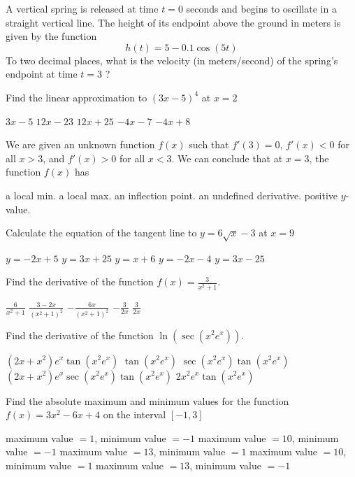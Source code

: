 \documentclass[11pt]{article}
\begin{document}
\begin{questions}
\begin{multiplechoice}{5}
\question A vertical spring is released at time $t = 0$ seconds and begins to oscillate in a straight vertical line.
The height of its endpoint above the ground in meters is given by the function
$$h(t) = 5 - 0.1\cos(5t)$$
To two decimal places, what is the velocity (in meters/second) of the spring's endpoint at time $t = 3$ ?
\begin{answers}{2}
\end{answers}

\newpage

\question Find the linear approximation to $(3x-5)^4$ at $x = 2$
\begin{answers}{2}
\ans $3x - 5$
\ans $12x - 23$
\ans $12x + 25$
\ans $-4x - 7$
\ans $-4x + 8$
\end{answers}


\question We are given an unknown function $f(x)$ such that $f'(3) = 0$, $f'(x) < 0$ for all $x > 3$, and $f'(x) > 0$ for all $x < 3$.
We can conclude that at $x = 3$, the function $f(x)$ has 
\begin{answers}{3}
\ans a local min.
\ans a local max.
\ans an inflection point.
\ans an undefined derivative.
\ans positive $y$-value.
\end{answers}

\question Calculate the equation of the tangent line to $y = 6 \sqrt{x} - 3$ at $x = 9$
\begin{answers}{2}
\ans $y = -2x + 5$
\ans $y = 3x + 25$
\ans $y = x + 6$
\ans $y = -2x -4$
\ans $y = 3x - 25$
\end{answers}


\question Find the derivative of the function $\displaystyle f(x) = \frac{3}{x^2 +1}$.
\begin{answers}{2}
\ans $ \displaystyle \frac{6}{x^2 + 1}$
\ans $ \displaystyle  \frac{3 - 2x }{(x^2 + 1)^2}$
\ans $ \displaystyle -\frac{6x}{(x^2 + 1)^2}$
\ans $ \displaystyle  - \frac{3}{2x}$
\ans $ \displaystyle  \frac{3}{2x}$
\end{answers}

\question Find the derivative of the function $\ln(\sec(x^2 e^x))$.
\begin{answers}{2}
\ans $(2x + x^2)e^x \tan(x^2 e^x)$
\ans $\tan(x^2 e^x)$
\ans $ \sec(x^2 e^x)\tan(x^2 e^x)$
\ans $(2x + x^2)e^x \sec(x^2 e^x)\tan(x^2 e^x)$
\ans $2x^2e^x \tan(x^2 e^x)$
\end{answers}




\question Find the absolute maximum and minimum values for the function 
$f(x) = 3x^2 - 6x + 4$ on the interval $[-1, 3]$
\begin{answers}{1}
\ans maximum value $= 1$, minimum value $ = -1$
\ans maximum value $= 10$, minimum value $ = -1$
\ans maximum value $= 13$, minimum value $ = 1$
\ans maximum value $= 10$, minimum value $ = 1$
\ans maximum value $= 13$, minimum value $ = -1$
\end{answers}



\end{multiplechoice}
\end{questions}
\end{document}
